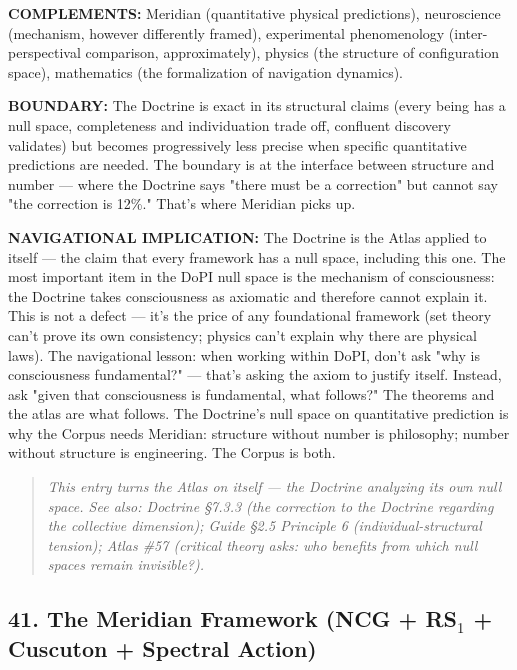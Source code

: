 \textbf{COMPLEMENTS:} Meridian (quantitative physical predictions), neuroscience (mechanism, however differently framed), experimental phenomenology (inter-perspectival comparison, approximately), physics (the structure of configuration space), mathematics (the formalization of navigation dynamics).


\textbf{BOUNDARY:} The Doctrine is exact in its structural claims (every being has a null space, completeness and individuation trade off, confluent discovery validates) but becomes progressively less precise when specific quantitative predictions are needed. The boundary is at the interface between structure and number — where the Doctrine says "there must be a correction" but cannot say "the correction is 12\%." That's where Meridian picks up.


\textbf{NAVIGATIONAL IMPLICATION:} The Doctrine is the Atlas applied to itself — the claim that every framework has a null space, including this one. The most important item in the DoPI null space is the mechanism of consciousness: the Doctrine takes consciousness as axiomatic and therefore cannot explain it. This is not a defect — it's the price of any foundational framework (set theory can't prove its own consistency; physics can't explain why there are physical laws). The navigational lesson: when working within DoPI, don't ask "why is consciousness fundamental?" — that's asking the axiom to justify itself. Instead, ask "given that consciousness is fundamental, what follows?" The theorems and the atlas are what follows. The Doctrine's null space on quantitative prediction is why the Corpus needs Meridian: structure without number is philosophy; number without structure is engineering. The Corpus is both.


\begin{quote}
\itshape
\textit{This entry turns the Atlas on itself — the Doctrine analyzing its own null space. See also: Doctrine §7.3.3 (the correction to the Doctrine regarding the collective dimension); Guide §2.5 Principle 6 (individual-structural tension); Atlas \#57 (critical theory asks: who benefits from which null spaces remain invisible?).}
\end{quote}


\bigskip\noindent\makebox[\textwidth]{\color{rulegray}\rule{5cm}{0.3pt}}\bigskip


\subsection*{41. The Meridian Framework (NCG + RS$_1$ + Cuscuton + Spectral Action)}


